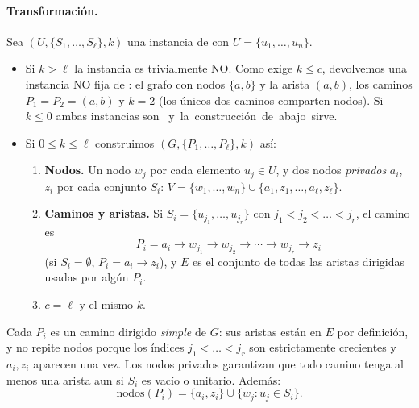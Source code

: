 \paragraph{Transformación.} Sea $(U,\{S_1,\dots,S_\ell\},k)$ una instancia de \SP{} con $U=\{u_1,\dots,u_n\}$.
\begin{itemize}
  \item Si $k>\ell$ la instancia es trivialmente NO. Como \PSP{} exige $k\le c$, devolvemos una instancia NO
  fija de \PSP: el grafo con nodos $\{a,b\}$ y la arista $(a,b)$, los caminos $P_1=P_2=(a,b)$ y $k=2$ (los
  únicos dos caminos comparten nodos). Si $k\le 0$ ambas instancias son \SI{} y la construcción de abajo sirve.
  \item Si $0\le k\le\ell$ construimos $(G,\{P_1,\dots,P_\ell\},k)$ así:
  \begin{enumerate}
    \item \textbf{Nodos.} Un nodo $w_j$ por cada elemento $u_j\in U$, y dos nodos \emph{privados} $a_i$, $z_i$ por
    cada conjunto $S_i$:
    $V=\{w_1,\dots,w_n\}\cup\{a_1,z_1,\dots,a_\ell,z_\ell\}$.
    \item \textbf{Caminos y aristas.} Si $S_i=\{u_{j_1},\dots,u_{j_r}\}$ con $j_1<j_2<\dots<j_r$, el camino es
    \[
      P_i = a_i \to w_{j_1}\to w_{j_2}\to\cdots\to w_{j_r}\to z_i
    \]
    (si $S_i=\emptyset$, $P_i=a_i\to z_i$), y $E$ es el conjunto de todas las aristas dirigidas usadas por
    algún $P_i$.
    \item $c=\ell$ y el mismo $k$.
  \end{enumerate}
\end{itemize}

Cada $P_i$ es un camino dirigido \emph{simple} de $G$: sus aristas están en $E$ por definición, y no repite
nodos porque los índices $j_1<\dots<j_r$ son estrictamente crecientes y $a_i,z_i$ aparecen una vez. Los nodos
privados garantizan que todo camino tenga al menos una arista aun si $S_i$ es vacío o unitario. Además:
\begin{equation}\label{eq:nodos}
  \text{nodos}(P_i) = \{a_i,z_i\}\cup\{w_j : u_j\in S_i\}. \tag{$*$}
\end{equation}

